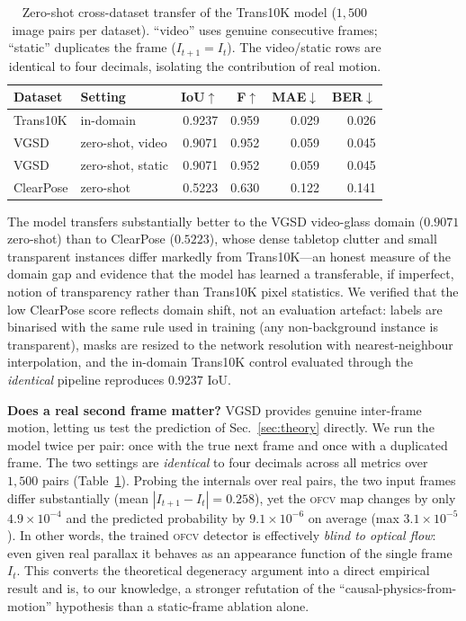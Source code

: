 \documentclass{bmvc2k}
\newcommand{\ofcv}{\textsc{ofcv}}
\newcommand{\iou}{IoU}
\begin{document}
\begin{table}[t]
\centering
\caption{Zero-shot cross-dataset transfer of the Trans10K model
($1{,}500$ image pairs per dataset). ``video'' uses genuine consecutive
frames; ``static'' duplicates the frame ($I_{t+1}=I_t$). The video/static rows
are identical to four decimals, isolating the contribution of real motion.}
\label{tab:cross}
\setlength{\tabcolsep}{4.5pt}
\begin{tabular}{llrrrr}
\toprule
Dataset & Setting & \iou$\uparrow$ & F$\uparrow$ & MAE$\downarrow$ & BER$\downarrow$ \\
\midrule
Trans10K & in-domain         & 0.9237 & 0.959 & 0.029 & 0.026 \\
VGSD     & zero-shot, video  & 0.9071 & 0.952 & 0.059 & 0.045 \\
VGSD     & zero-shot, static & 0.9071 & 0.952 & 0.059 & 0.045 \\
ClearPose& zero-shot         & 0.5223 & 0.630 & 0.122 & 0.141 \\
\bottomrule
\end{tabular}
\end{table}

The model transfers substantially better to the VGSD video-glass domain
($0.9071$ zero-shot) than to ClearPose ($0.5223$), whose dense tabletop clutter
and small transparent instances differ markedly from Trans10K---an honest
measure of the domain gap and evidence that the model has learned a
transferable, if imperfect, notion of transparency rather than Trans10K pixel
statistics. We verified that the low ClearPose score reflects domain shift, not
an evaluation artefact: labels are binarised with the same rule used in training
(any non-background instance is transparent), masks are resized to the network
resolution with nearest-neighbour interpolation, and the in-domain Trans10K
control evaluated through the \emph{identical} pipeline reproduces $0.9237$
\iou{}.

\textbf{Does a real second frame matter?} VGSD provides genuine inter-frame
motion, letting us test the prediction of Sec.~\ref{sec:theory} directly. We run
the model twice per pair: once with the true next frame and once with a
duplicated frame. The two settings are \emph{identical} to four decimals across
all metrics over $1{,}500$ pairs (Table~\ref{tab:cross}). Probing the internals over real pairs, the
two input frames differ substantially (mean $|I_{t+1}-I_t|=0.258$), yet the
\ofcv{} map changes by only $4.9\times10^{-4}$ and the predicted probability by
$9.1\times10^{-6}$ on average (max $3.1\times10^{-5}$). In other words, the
trained \ofcv{} detector is effectively \emph{blind to optical flow}: even given
real parallax it behaves as an appearance function of the single frame
$I_t$. This converts the theoretical degeneracy argument into a direct empirical
result and is, to our knowledge, a stronger refutation of the
``causal-physics-from-motion'' hypothesis than a static-frame ablation alone.
\end{document}
